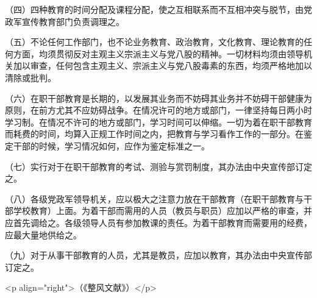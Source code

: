 （四）四种教育的时间分配及课程分配，使之互相联系而不互相冲突与脱节，由党政军宣传教育部门负责调理之。

（五）不论任何工作部门，也不论业务教育、政治教育，文化教育、理论教育的任何方面，均须贯彻反对主观主义宗派主义与党八股的精神。一切材料均须由领导机关加以审查，任何包含主观主义、宗派主义与党八股毒素的东西，均须严格地加以清除或批判。

（六）在职干部教育是长期的，以发展其业务而不妨碍其业务并不妨碍干部健康为原则，在前方尤其不应妨碍战争。在情况许可的地方或部门，一律坚持每日两小时学习制。在情况不许可的地方或部门，学习时间可以伸缩。一切为着在职干部教育而耗费的时间，均算入正规工作时间之内，把教育与学习看作工作的一部分。在鉴定干部的时候，学习情况如何，应作为鉴定标准之一。

（七）实行对于在职干部教育的考试、测验与赏罚制度，其办法由中央宣传部订定之。

（八）各级党政军领导机关，应以极大之注意力放在干部教育（在职干部教育与干部学校教育）上面。为着干部而需用的人员（教员与职员）应加以严格的审查，并应首先调给之。各级领导人员有参加教课的责任。为着干部教育而需要用的经费，应最大量地供给之。

（九）对于从事干部教育的人员，尤其是教员，应加以教育，其办法由中央宣传部订定之。

<p align="right">（《整风文献》）</p>


